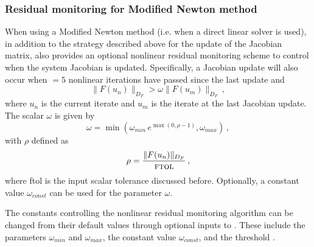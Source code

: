 
\subsubsection*{Residual monitoring for Modified Newton method}
When using a Modified Newton method (i.e. when a direct linear solver is 
used), in addition to the strategy described above for the update of the Jacobian 
matrix, {\kinsol} also provides an optional nonlinear residual monitoring
scheme to control when the system Jacobian is updated. Specifically, a Jacobian 
update will also occur when $=5$ nonlinear iterations have passed 
since the last update and
\[ \|F(u_n)\|_{D_F} > \omega \|F(u_m)\|_{D_F} \, , \]
where $u_n$ is the current iterate and $u_m$ is the iterate at the last Jacobian
update. The scalar $\omega$ is given by
\begin{equation}\label{resmon_omega}
\omega = \min \left (\omega_{min} \, e^{\max \left ( 0 , \rho - 1 \right )} , \omega_{max}\right ) \, ,
\end{equation}
with $\rho$ defined as
\begin{equation}
\rho = \frac{\|F(u_n) \|_{D_F}}{\mbox{{\sc ftol}}} \, ,
\end{equation}
where {\sc ftol} is the input scalar tolerance discussed before.
Optionally, a constant value $\omega_{const}$ can be used for the parameter $\omega$.


The constants controlling the nonlinear residual monitoring algorithm can
be changed from their default values through optional inputs to {\kinsol}.
These include the parameters $\omega_{min}$ and $\omega_{max}$, the constant 
value $\omega_{const}$, and the threshold .


